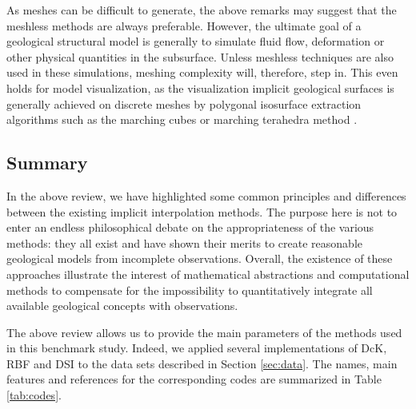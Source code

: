 \documentclass[final]{ring20}
\begin{document}
{As meshes can be difficult to generate, the above remarks may suggest that the meshless methods are always preferable. However, the ultimate goal of a geological structural model is generally to simulate fluid flow, deformation or other physical quantities in the subsurface. Unless meshless techniques are also used in these simulations, meshing complexity will, therefore, step in. This even holds for model visualization, as the visualization implicit geological surfaces is generally achieved on discrete meshes by polygonal isosurface extraction algorithms such as the marching cubes \citep{Calcagno2008PEPI} or marching terahedra method \citep{Frank2007CG}. 

\subsection{Summary}

In the above review, we have highlighted some common principles and differences between the existing implicit interpolation methods. The purpose here is not to enter an endless philosophical debate on the appropriateness of the various methods: they all exist and have shown their merits to create reasonable geological models from incomplete observations. Overall, the existence of these approaches illustrate the interest of mathematical abstractions and computational methods to compensate for the impossibility to quantitatively integrate all available geological concepts with observations. 

The above review allows us to provide the main parameters of the methods used in this benchmark study. Indeed, we applied several implementations of DcK, RBF and DSI to the data sets described in Section \ref{sec:data}. The names, main features and references 
for the corresponding codes are summarized in Table \ref{tab:codes}. 

}
\end{document}
